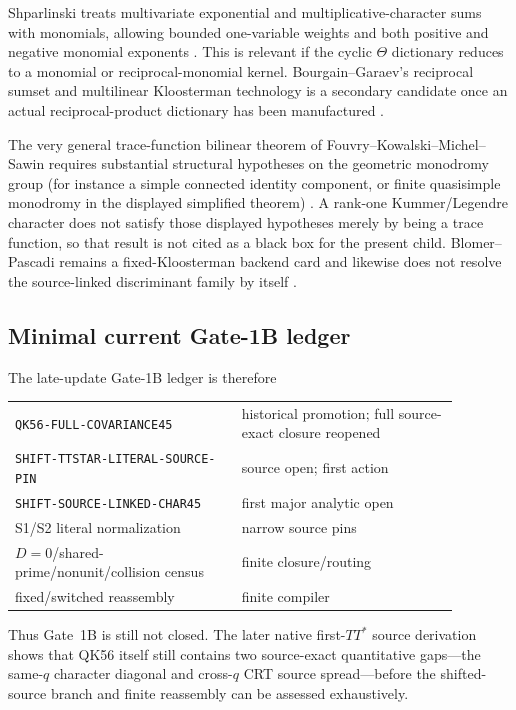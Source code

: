 \documentclass[11pt]{article}
\theoremstyle{definition}
\newcommand{\1}{\mathbf 1}
\begin{document}
Shparlinski treats multivariate exponential and multiplicative-character sums
with monomials, allowing bounded one-variable weights and both positive and
negative monomial exponents \cite{Shparlinski2013}.  This is relevant if the
cyclic $\Theta$ dictionary reduces to a monomial or reciprocal-monomial kernel.
Bourgain--Garaev's reciprocal sumset and multilinear Kloosterman technology is
a secondary candidate once an actual reciprocal-product dictionary has been
manufactured \cite{BourgainGaraev2012}.

The very general trace-function bilinear theorem of
Fouvry--Kowalski--Michel--Sawin requires substantial structural hypotheses on
the geometric monodromy group (for instance a simple connected identity
component, or finite quasisimple monodromy in the displayed simplified
theorem) \cite{FouvryKowalskiMichelSawin2025}.  A rank-one Kummer/Legendre
character does not satisfy those displayed hypotheses merely by being a trace
function, so that result is not cited as a black box for the present child.
Blomer--Pascadi remains a fixed-Kloosterman backend card and likewise does not
resolve the source-linked discriminant family by itself
\cite{BlomerPascadi2026}.

\subsection{Minimal current Gate-1B ledger}
The late-update Gate-1B ledger is therefore
\begin{center}
\small
\begin{tabular}{p{0.45\linewidth}p{0.43\linewidth}}
\texttt{QK56-FULL-COVARIANCE45}
  & historical promotion; full source-exact closure reopened\\
\texttt{SHIFT-TTSTAR-LITERAL-SOURCE-PIN}
  & source open; first action\\
\texttt{SHIFT-SOURCE-LINKED-CHAR45}
  & first major analytic open\\
S1/S2 literal normalization
  & narrow source pins\\
$D=0$/shared-prime/nonunit/collision census
  & finite closure/routing\\
fixed/switched reassembly
  & finite compiler
\end{tabular}
\end{center}
Thus Gate~1B is still not closed.  The later native first-$TT^\ast$ source
derivation shows that QK56 itself still contains two source-exact quantitative
gaps---the same-$q$ character diagonal and cross-$q$ CRT source spread---before
the shifted-source branch and finite reassembly can be assessed exhaustively.
\end{document}
